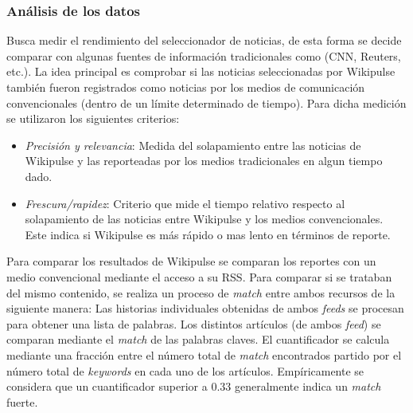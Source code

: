 \subsubsection{Análisis de los datos}
Busca medir el rendimiento del seleccionador de noticias, de esta forma se decide comparar con algunas fuentes de información tradicionales como (CNN, Reuters, etc.). La idea principal es comprobar si las noticias seleccionadas por Wikipulse también fueron registrados como noticias por los medios de comunicación convencionales (dentro de un límite determinado de tiempo). Para dicha medición se utilizaron los siguientes criterios:

\begin{itemize}
	\item \textit{Precisión y relevancia}:
	Medida del solapamiento entre las noticias de Wikipulse y las reporteadas por los medios tradicionales en algun tiempo dado.
	\item \textit{Frescura/rapidez}:
	Criterio que mide el tiempo relativo respecto al solapamiento de las noticias entre Wikipulse y los medios convencionales. Este indica si Wikipulse es más rápido o mas lento en términos de reporte.
\end{itemize}

Para comparar los resultados de Wikipulse se comparan los reportes con un medio convencional mediante el acceso a su RSS. Para comparar si se trataban del mismo contenido, se realiza un proceso de \emph{match} entre ambos recursos de la siguiente manera: Las historias individuales obtenidas de ambos \emph{feeds} se procesan para obtener una lista de palabras. Los distintos artículos (de ambos \textit{feed}) se comparan mediante el \emph{match} de las palabras claves. El cuantificador se calcula mediante una fracción entre el número total de \textit{match} encontrados partido por el número total de \emph{keywords} en cada uno de los artículos. Empíricamente se considera que un cuantificador superior a 0.33 generalmente indica un \emph{match} fuerte.
